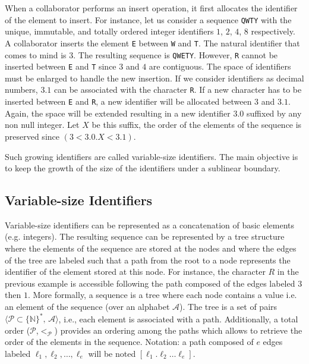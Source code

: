 When a collaborator performs an insert operation, it first allocates the
identifier of the element to insert. For instance, let us consider a sequence
\texttt{QWTY} with the unique, immutable, and totally ordered integer
identifiers $1$, $2$, $4$, $8$ respectively. A collaborator inserts the element
\texttt{E} between \texttt{W} and \texttt{T}. The natural identifier that comes
to mind is $3$. The resulting sequence is \texttt{QWETY}. However, \texttt{R}
cannot be inserted between \texttt{E} and \texttt{T} since $3$ and $4$ are
contiguous. The space of identifiers must be enlarged to handle the new
insertion. If we consider identifiers as decimal numbers, $3.1$ can be
associated with the character \texttt{R}. If a new character has to be inserted
between \texttt{E} and \texttt{R}, a new identifier will be allocated between
$3$ and $3.1$. Again, the space will be extended resulting in a new identifier
$3.0$ suffixed by any non null integer. Let $X$ be this suffix, the order of the
elements of the sequence is preserved since $(3 < 3.0.X < 3.1)$.

Such growing identifiers are called variable-size identifiers. The main
objective is to keep the growth of the size of the identifiers under a sublinear
boundary.

\subsection{Variable-size Identifiers}
\label{subsec:variable}

Variable-size identifiers can be represented as a concatenation of basic
elements (e.g. integers). The resulting sequence can be represented by a tree
structure where the elements of the sequence are stored at the nodes and where
the edges of the tree are labeled such that a path from the root to a node
represents the identifier of the element stored at this node. For instance, the
character $R$ in the previous example is accessible following the path composed
of the edges labeled $3$ then $1$. More formally, a sequence is a tree where
each node contains a value i.e. an element of the sequence (over an alphabet
$\mathcal{A}$). The tree is a set of pairs
$\langle\mathcal{P}\subset\{\mathbb{N}\}^*,\, \mathcal{A} \rangle$, i.e., each
element is associated with a path. Additionally, a total order
($\mathcal{P}$,$<_{\mathcal{P}}$) provides an ordering among the paths which
allows to retrieve the order of the elements in the sequence. Notation: a path
composed of $e$ edges labeled $\ell_1,\ell_2,\ldots,\ell_e$ will be noted
$[\ell_1.\ell_2\ldots\ell_e]$.

